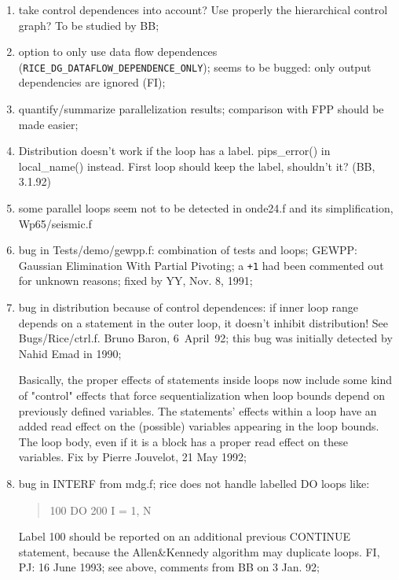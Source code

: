 \begin{enumerate}

  \item take control dependences into account? Use properly the hierarchical
	control graph? To be studied by BB;

  \item {} option to only use data flow dependences
	(\verb+RICE_DG_DATAFLOW_DEPENDENCE_ONLY+); seems to be bugged: only
	output dependencies are ignored (FI);

  \item {} 
	quantify/summarize parallelization results; comparison with FPP
	should be made easier;

  \item Distribution doesn't work if the loop has a label. pips\_error()
	in local\_name() instead. First loop should keep the label,
	shouldn't it? (BB, 3.1.92)

  \item some parallel loops seem not to be detected in onde24.f and
	its simplification, Wp65/seismic.f

  \item bug in Tests/demo/gewpp.f: combination of tests and loops; 
	GEWPP: Gaussian Elimination With Partial Pivoting;
	a \verb/+1/ had
	been commented out for unknown reasons; fixed by YY, Nov. 8,
	1991;

  \item bug in distribution because of control dependences: if inner
	loop range depends on a statement in the outer loop, it doesn't
	inhibit distribution! See Bugs/Rice/ctrl.f. Bruno Baron,
	6~April~92; this bug was initially detected by Nahid Emad in 1990;

	Basically, the proper effects of statements inside loops now include
	some kind of "control" effects that force sequentialization when loop
	bounds depend on previously defined variables.  The statements' effects
	within a loop have an added read effect on the (possible) variables
	appearing in the loop bounds. The loop body, even if it is a block has
	a proper read effect on these variables. Fix by Pierre Jouvelot, 21 May
	1992;

  \item bug in INTERF from mdg.f; rice does not handle labelled DO loops
like:
\begin{quote}
100 DO 200 I = 1, N
\end{quote}
Label 100 should be reported on an additional previous CONTINUE
statement, because the Allen\&Kennedy algorithm may duplicate loops.
FI, PJ: 16 June 1993; see above, comments from BB on 3 Jan. 92;

\end{enumerate}

